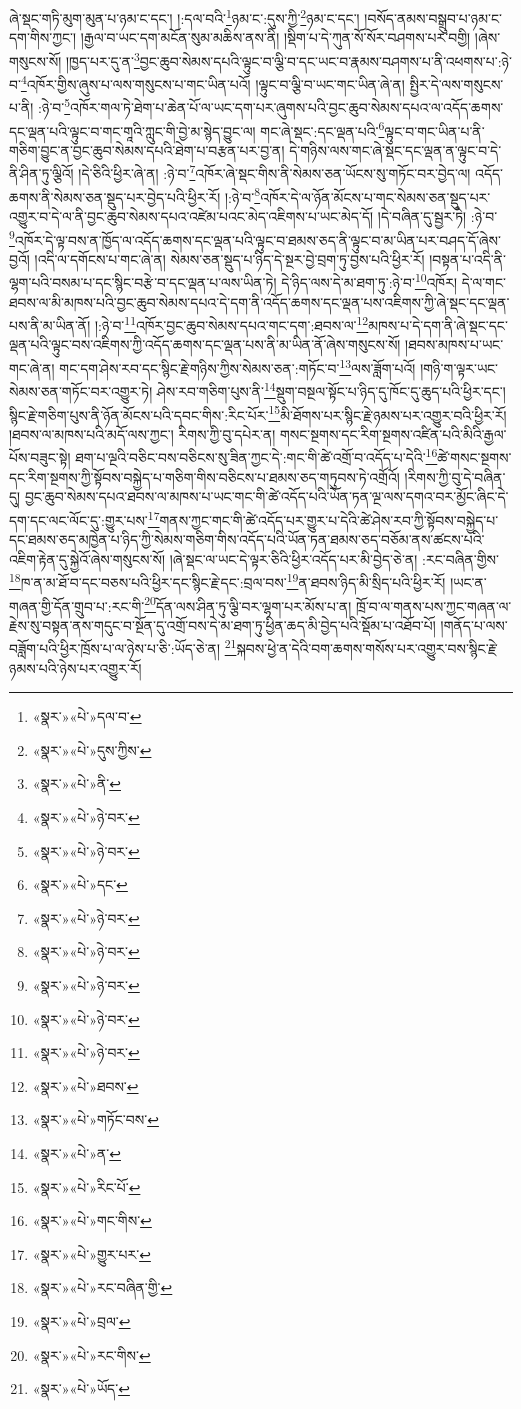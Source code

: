 ཞེ་སྡང་གཏི་མུག་མུན་པ་ཉམ་ང་དང་། །:དལ་བའི་\footnote{«སྣར་»«པེ་»དལ་བ་}ཉམ་ང་:དུས་ཀྱི་\footnote{«སྣར་»«པེ་»དུས་ཀྱིས་}ཉམ་ང་དང་། །བསོད་ནམས་བསྒྲུབ་པ་ཉམ་ང་དག་གིས་ཀྱང་། །རྒྱལ་བ་ཡང་དག་མངོན་སུམ་མཆིས་ནས་ནི། །སྡིག་པ་དེ་ཀུན་སོ་སོར་བཤགས་པར་བགྱི། །ཞེས་གསུངས་སོ། །ཁྱད་པར་དུ་ན་\footnote{«སྣར་»«པེ་»ནི་}བྱང་ཆུབ་སེམས་དཔའི་ལྟུང་བ་ལྕི་བ་དང་ཡང་བ་རྣམས་བཤགས་པ་ནི་འཕགས་པ་:ཉེ་བ་\footnote{«སྣར་»«པེ་»ཉེ་བར་}འཁོར་གྱིས་ཞུས་པ་ལས་གསུངས་པ་གང་ཡིན་པའོ། །ལྟུང་བ་ལྕི་བ་ཡང་གང་ཡིན་ཞེ་ན། སྤྱིར་དེ་ལས་གསུངས་པ་ནི། :ཉེ་བ་\footnote{«སྣར་»«པེ་»ཉེ་བར་}འཁོར་གལ་ཏེ་ཐེག་པ་ཆེན་པོ་ལ་ཡང་དག་པར་ཞུགས་པའི་བྱང་ཆུབ་སེམས་དཔའ་ལ་འདོད་ཆགས་དང་ལྡན་པའི་ལྟུང་བ་གང་གཱའི་ཀླུང་གི་བྱེ་མ་སྙེད་བྱུང་ལ། གང་ཞེ་སྡང་:དང་ལྡན་པའི་\footnote{«སྣར་»«པེ་»དང་}ལྟུང་བ་གང་ཡིན་པ་ནི་གཅིག་བྱུང་ན་བྱང་ཆུབ་སེམས་དཔའི་ཐེག་པ་བརྩན་པར་བྱ་ན། དེ་གཉིས་ལས་གང་ཞེ་སྡང་དང་ལྡན་ན་ལྟུང་བ་དེ་ནི་ཤིན་ཏུ་ལྕིའོ། །དེ་ཅིའི་ཕྱིར་ཞེ་ན། :ཉེ་བ་\footnote{«སྣར་»«པེ་»ཉེ་བར་}འཁོར་ཞེ་སྡང་གིས་ནི་སེམས་ཅན་ཡོངས་སུ་གཏོང་བར་བྱེད་ལ། འདོད་ཆགས་ནི་སེམས་ཅན་སྡུད་པར་བྱེད་པའི་ཕྱིར་རོ། །:ཉེ་བ་\footnote{«སྣར་»«པེ་»ཉེ་བར་}འཁོར་དེ་ལ་ཉོན་མོངས་པ་གང་སེམས་ཅན་སྡུད་པར་འགྱུར་བ་དེ་ལ་ནི་བྱང་ཆུབ་སེམས་དཔའ་འཛེམ་པའང་མེད་འཇིགས་པ་ཡང་མེད་དོ། །དེ་བཞིན་དུ་སྦྱར་ཏེ། :ཉེ་བ་\footnote{«སྣར་»«པེ་»ཉེ་བར་}འཁོར་དེ་ལྟ་བས་ན་ཁྱོད་ལ་འདོད་ཆགས་དང་ལྡན་པའི་ལྟུང་བ་ཐམས་ཅད་ནི་ལྟུང་བ་མ་ཡིན་པར་བཤད་དོ་ཞེས་བྱའོ། །འདི་ལ་དགོངས་པ་གང་ཞེ་ན། སེམས་ཅན་སྡུད་པ་ཉིད་དེ་སྔར་བྱེ་བྲག་ཏུ་བྱས་པའི་ཕྱིར་རོ། །བསྟན་པ་འདི་ནི་ལྷག་པའི་བསམ་པ་དང་སྙིང་བརྩེ་བ་དང་ལྡན་པ་ལས་ཡིན་ཏེ། དེ་ཉིད་ལས་དེ་མ་ཐག་ཏུ་:ཉེ་བ་\footnote{«སྣར་»«པེ་»ཉེ་བར་}འཁོར། དེ་ལ་གང་ཐབས་ལ་མི་མཁས་པའི་བྱང་ཆུབ་སེམས་དཔའ་དེ་དག་ནི་འདོད་ཆགས་དང་ལྡན་པས་འཇིགས་ཀྱི་ཞེ་སྡང་དང་ལྡན་པས་ནི་མ་ཡིན་ནོ། །:ཉེ་བ་\footnote{«སྣར་»«པེ་»ཉེ་བར་}འཁོར་བྱང་ཆུབ་སེམས་དཔའ་གང་དག་:ཐབས་ལ་\footnote{«སྣར་»«པེ་»ཐབས་}མཁས་པ་དེ་དག་ནི་ཞེ་སྡང་དང་ལྡན་པའི་ལྟུང་བས་འཇིགས་ཀྱི་འདོད་ཆགས་དང་ལྡན་པས་ནི་མ་ཡིན་ནོ་ཞེས་གསུངས་སོ། །ཐབས་མཁས་པ་ཡང་གང་ཞེ་ན། གང་དག་ཤེས་རབ་དང་སྙིང་རྗེ་གཉིས་ཀྱིས་སེམས་ཅན་:གཏོང་བ་\footnote{«སྣར་»«པེ་»གཏོང་བས་}ལས་ཟློག་པའོ། །གཉི་ག་ལྟར་ཡང་སེམས་ཅན་གཏོང་བར་འགྱུར་ཏེ། ཤེས་རབ་གཅིག་པུས་ནི་\footnote{«སྣར་»«པེ་»ན་}སྡུག་བསྔལ་སྟོང་པ་ཉིད་དུ་ཁོང་དུ་ཆུད་པའི་ཕྱིར་དང་། སྙིང་རྗེ་གཅིག་པུས་ནི་ཉོན་མོངས་པའི་དབང་གིས་:རིང་པོར་\footnote{«སྣར་»«པེ་»རིང་པོ་}མི་ཐོགས་པར་སྙིང་རྗེ་ཉམས་པར་འགྱུར་བའི་ཕྱིར་རོ། །ཐབས་ལ་མཁས་པའི་མདོ་ལས་ཀྱང་། རིགས་ཀྱི་བུ་དཔེར་ན། གསང་སྔགས་དང་རིག་སྔགས་འཛིན་པའི་མིའི་རྒྱལ་པོས་བཟུང་སྟེ། ཐག་པ་ལྔའི་བཅིང་བས་བཅིངས་སུ་ཟིན་ཀྱང་དེ་:གང་གི་ཚེ་འགྲོ་བ་འདོད་པ་དེའི་\footnote{«སྣར་»«པེ་»གང་གིས་}ཚེ་གསང་སྔགས་དང་རིག་སྔགས་ཀྱི་སྟོབས་བསྐྱེད་པ་གཅིག་གིས་བཅིངས་པ་ཐམས་ཅད་གཏུབས་ཏེ་འགྲོའོ། །རིགས་ཀྱི་བུ་དེ་བཞིན་དུ། བྱང་ཆུབ་སེམས་དཔའ་ཐབས་ལ་མཁས་པ་ཡང་གང་གི་ཚེ་འདོད་པའི་ཡོན་ཏན་ལྔ་ལས་དགའ་བར་མྱོང་ཞིང་དེ་དག་དང་ལང་ལོང་དུ་:གྱུར་པས་\footnote{«སྣར་»«པེ་»གྱུར་པར་}གནས་ཀྱང་གང་གི་ཚེ་འདོད་པར་གྱུར་པ་དེའི་ཚེ་ཤེས་རབ་ཀྱི་སྟོབས་བསྐྱེད་པ་དང་ཐམས་ཅད་མཁྱེན་པ་ཉིད་ཀྱི་སེམས་གཅིག་གིས་འདོད་པའི་ཡོན་ཏན་ཐམས་ཅད་བཅོམ་ནས་ཚངས་པའི་འཇིག་རྟེན་དུ་སྐྱེའོ་ཞེས་གསུངས་སོ། །ཞེ་སྡང་ལ་ཡང་དེ་ལྟར་ཅིའི་ཕྱིར་འདོད་པར་མི་བྱེད་ཅེ་ན། :རང་བཞིན་གྱིས་\footnote{«སྣར་»«པེ་»རང་བཞིན་གྱི་}ཁ་ན་མ་ཐོ་བ་དང་བཅས་པའི་ཕྱིར་དང་སྙིང་རྗེ་དང་:བྲལ་བས་\footnote{«སྣར་»«པེ་»བྲལ་}ན་ཐབས་ཉིད་མི་སྲིད་པའི་ཕྱིར་རོ། །ཡང་ན་གཞན་གྱི་དོན་གྲུབ་པ་:རང་གི་\footnote{«སྣར་»«པེ་»རང་གིས་}དོན་ལས་ཤིན་ཏུ་ལྕི་བར་ལྷག་པར་མོས་པ་ན། ཁྲོ་བ་ལ་གནས་པས་ཀྱང་གཞན་ལ་རྗེས་སུ་བསྟན་ནས་གདུང་བ་སྔོན་དུ་འགྲོ་བས་དེ་མ་ཐག་ཏུ་ཕྱིན་ཆད་མི་བྱེད་པའི་སྡོམ་པ་འཐོབ་པོ། །གནོད་པ་ལས་བཟློག་པའི་ཕྱིར་ཁྲོས་པ་ལ་ཉེས་པ་ཅི་:ཡོད་ཅེ་ན། \footnote{«སྣར་»«པེ་»ཡོད་}སྐབས་ཕྱེ་ན་དེའི་བག་ཆགས་གསོས་པར་འགྱུར་བས་སྙིང་རྗེ་ཉམས་པའི་ཉེས་པར་འགྱུར་རོ། 